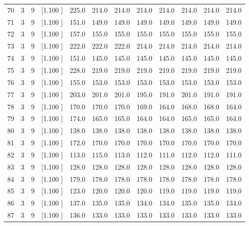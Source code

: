 \documentclass[12pt,a4paper]{article}
\begin{document}
\begin{center}
{\begin{tabular}{r r r r r r r r r r r r}
  70&  3&  9&[1.100     ]&   225.0&   214.0&   214.0&   214.0&   214.0&   214.0&   214.0&   214.0\\[-0.02in]
  71&  3&  9&[1.100     ]&   151.0&   149.0&   149.0&   149.0&   149.0&   149.0&   149.0&   149.0\\[-0.02in]
  72&  3&  9&[1.100     ]&   157.0&   155.0&   155.0&   155.0&   155.0&   155.0&   155.0&   155.0\\[-0.02in]
  73&  3&  9&[1.100     ]&   222.0&   222.0&   222.0&   214.0&   214.0&   214.0&   214.0&   214.0\\[-0.02in]
  74&  3&  9&[1.100     ]&   151.0&   145.0&   145.0&   145.0&   145.0&   145.0&   145.0&   145.0\\[-0.02in]
  75&  3&  9&[1.100     ]&   228.0&   219.0&   219.0&   219.0&   219.0&   219.0&   219.0&   219.0\\[-0.02in]
  76&  3&  9&[1.100     ]&   155.0&   153.0&   153.0&   153.0&   153.0&   153.0&   153.0&   153.0\\[-0.02in]
  77&  3&  9&[1.100     ]&   203.0&   201.0&   201.0&   195.0&   191.0&   201.0&   191.0&   191.0\\[-0.02in]
  78&  3&  9&[1.100     ]&   170.0&   170.0&   170.0&   169.0&   164.0&   168.0&   168.0&   164.0\\[-0.02in]
  79&  3&  9&[1.100     ]&   174.0&   165.0&   165.0&   164.0&   164.0&   165.0&   165.0&   164.0\\[-0.02in]
  80&  3&  9&[1.100     ]&   138.0&   138.0&   138.0&   138.0&   138.0&   138.0&   138.0&   138.0\\[-0.02in]
  81&  3&  9&[1.100     ]&   172.0&   170.0&   170.0&   170.0&   170.0&   170.0&   170.0&   170.0\\[-0.02in]
  82&  3&  9&[1.100     ]&   113.0&   115.0&   113.0&   112.0&   111.0&   112.0&   112.0&   111.0\\[-0.02in]
  83&  3&  9&[1.100     ]&   128.0&   128.0&   128.0&   128.0&   128.0&   128.0&   128.0&   128.0\\[-0.02in]
  84&  3&  9&[1.100     ]&   179.0&   178.0&   178.0&   178.0&   178.0&   178.0&   178.0&   178.0\\[-0.02in]
  85&  3&  9&[1.100     ]&   123.0&   120.0&   120.0&   120.0&   119.0&   119.0&   119.0&   119.0\\[-0.02in]
  86&  3&  9&[1.100     ]&   137.0&   135.0&   135.0&   134.0&   134.0&   135.0&   135.0&   134.0\\[-0.02in]
  87&  3&  9&[1.100     ]&   136.0&   133.0&   133.0&   133.0&   133.0&   133.0&   133.0&   133.0\\[-0.02in]

\end{tabular}}
\end{center}
\end{document}
